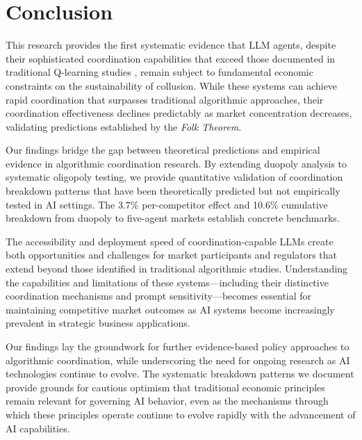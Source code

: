 \section{Conclusion}\label{sec:con}
% 
% 

This research provides the first systematic evidence that LLM agents, despite their sophisticated coordination capabilities that exceed those documented in traditional Q-learning studies \parencite{calvano_artificial_2020, klein_autonomous_2021}, remain subject to fundamental economic constraints on the sustainability of collusion. While these systems can achieve rapid coordination that surpasses traditional algorithmic approaches, their coordination effectiveness declines predictably as market concentration decreases, validating predictions established by the \emph{Folk Theorem}.

Our findings bridge the gap between theoretical predictions and empirical evidence in algorithmic coordination research. By extending \textcite{fish_algorithmic_2025} duopoly analysis to systematic oligopoly testing, we provide quantitative validation of coordination breakdown patterns that have been theoretically predicted but not empirically tested in AI settings. The 3.7\% per-competitor effect and 10.6\% cumulative breakdown from duopoly to five-agent markets establish concrete benchmarks.

The accessibility and deployment speed of coordination-capable LLMs create both opportunities and challenges for market participants and regulators that extend beyond those identified in traditional algorithmic studies. Understanding the capabilities and limitations of these systems---including their distinctive coordination mechanisms and prompt sensitivity—becomes essential for maintaining competitive market outcomes as AI systems become increasingly prevalent in strategic business applications.

Our findings lay the groundwork for further evidence-based policy approaches to algorithmic coordination, while underscoring the need for ongoing research as AI technologies continue to evolve. The systematic breakdown patterns we document provide grounds for cautious optimism that traditional economic principles remain relevant for governing AI behavior, even as the mechanisms through which these principles operate continue to evolve rapidly with the advancement of AI capabilities.